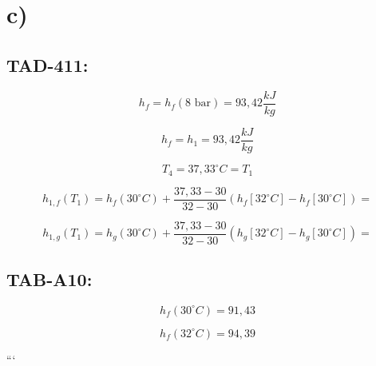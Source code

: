 

\section*{c)}

\subsection*{TAD-411:}

\begin{equation*}
h_f = h_f (8 \text{ bar}) = 93,42 \frac{kJ}{kg}
\end{equation*}

\begin{equation*}
h_f = h_1 = 93,42 \frac{kJ}{kg}
\end{equation*}

\begin{equation*}
T_{4} = 37,33^\circ C = T_{1}
\end{equation*}

\begin{equation*}
h_{1,f} (T_1) = h_f (30^\circ C) + \frac{37,33 - 30}{32 - 30} (h_{f} [32^\circ C] - h_f [30^\circ C]) =
\end{equation*}

\begin{equation*}
h_{1,g} (T_1) = h_g (30^\circ C) + \frac{37,33 - 30}{32 - 30} (h_{g} [32^\circ C] - h_g [30^\circ C]) =
\end{equation*}

\subsection*{TAB-A10:}

\begin{equation*}
h_f (30^\circ C) = 91,43
\end{equation*}

\begin{equation*}
h_f (32^\circ C) = 94,39
\end{equation*}

```